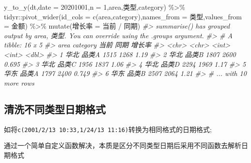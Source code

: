 \documentclass[
]{book}
\newenvironment{Shaded}{\begin{snugshade}}{\end{snugshade}}
\newcommand{\AttributeTok}[1]{\textcolor[rgb]{0.77,0.63,0.00}{#1}}
\newcommand{\CommentTok}[1]{\textcolor[rgb]{0.56,0.35,0.01}{\textit{#1}}}
\newcommand{\DecValTok}[1]{\textcolor[rgb]{0.00,0.00,0.81}{#1}}
\newcommand{\FunctionTok}[1]{\textcolor[rgb]{0.00,0.00,0.00}{#1}}
\newcommand{\NormalTok}[1]{#1}
\newcommand{\OtherTok}[1]{\textcolor[rgb]{0.56,0.35,0.01}{#1}}
\newcommand{\SpecialCharTok}[1]{\textcolor[rgb]{0.00,0.00,0.00}{#1}}
\newcommand{\StringTok}[1]{\textcolor[rgb]{0.31,0.60,0.02}{#1}}
\begin{document}
\begin{Shaded}
\begin{Highlighting}[]
\FunctionTok{y\_to\_y}\NormalTok{(dt,}\AttributeTok{date =} \StringTok{\textquotesingle{}20201001\textquotesingle{}}\NormalTok{,}\AttributeTok{n =} \DecValTok{1}\NormalTok{,area,类型,category) }\SpecialCharTok{\%\textgreater{}\%} 
\NormalTok{  tidyr}\SpecialCharTok{::}\FunctionTok{pivot\_wider}\NormalTok{(}\AttributeTok{id\_cols =} \FunctionTok{c}\NormalTok{(}\StringTok{\textquotesingle{}area\textquotesingle{}}\NormalTok{,}\StringTok{\textquotesingle{}category\textquotesingle{}}\NormalTok{),}\AttributeTok{names\_from =} \StringTok{\textquotesingle{}类型\textquotesingle{}}\NormalTok{,}\AttributeTok{values\_from =} \StringTok{\textquotesingle{}金额\textquotesingle{}}\NormalTok{) }\SpecialCharTok{\%\textgreater{}\%} 
  \FunctionTok{mutate}\NormalTok{(增长率 }\OtherTok{=}\NormalTok{ 当前 }\SpecialCharTok{/}\NormalTok{ 同期)}
\CommentTok{\#\textgreater{} \textasciigrave{}summarise()\textasciigrave{} has grouped output by \textquotesingle{}area\textquotesingle{}, \textquotesingle{}类型\textquotesingle{}. You can override using the \textasciigrave{}.groups\textasciigrave{} argument.}
\CommentTok{\#\textgreater{} \# A tibble: 16 x 5}
\CommentTok{\#\textgreater{}   area  category  当前  同期 增长率}
\CommentTok{\#\textgreater{}   \textless{}chr\textgreater{} \textless{}chr\textgreater{}    \textless{}int\textgreater{} \textless{}int\textgreater{}  \textless{}dbl\textgreater{}}
\CommentTok{\#\textgreater{} 1 华北  品类A     1515  1268  1.19 }
\CommentTok{\#\textgreater{} 2 华北  品类B     1807  2600  0.695}
\CommentTok{\#\textgreater{} 3 华北  品类C     1956  1837  1.06 }
\CommentTok{\#\textgreater{} 4 华北  品类D     2294  1969  1.17 }
\CommentTok{\#\textgreater{} 5 华东  品类A     1797  2400  0.749}
\CommentTok{\#\textgreater{} 6 华东  品类B     2507  2064  1.21 }
\CommentTok{\#\textgreater{} \# ... with 10 more rows}
\end{Highlighting}
\end{Shaded}

\hypertarget{ux6e05ux6d17ux4e0dux540cux7c7bux578bux65e5ux671fux683cux5f0f}{%
\subsection{清洗不同类型日期格式}\label{ux6e05ux6d17ux4e0dux540cux7c7bux578bux65e5ux671fux683cux5f0f}}

如将\texttt{c(\textquotesingle{}2001/2/13\ 10:33\textquotesingle{},\textquotesingle{}1/24/13\ 11:16\textquotesingle{})}转换为相同格式的日期格式;

通过一个简单自定义函数解决，本质是区分不同类型日期后采用不同函数去解析日期格式
\end{document}
